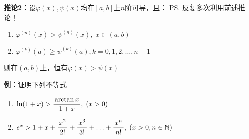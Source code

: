 {\b {\bf 推论2：}设$\varphi(x),\psi(x) $均在$[a,b]$上$n$阶可导，且：
\ps{反复多次利用前述推论！}
\begin{enumerate}[(1)]
  \setlength{\itemindent}{1cm}
  \item $\varphi^{(n)}(x)>\psi^{(n)}(x),\;x\in(a,b)$
  \item $\varphi^{(k)}(a)\geq\psi^{(k)}(a),k=0,1,2,\ldots,n-1$
\end{enumerate}
则在$(a,b)$上，恒有$\varphi(x)>\psi(x)$}

{\bf 例：}证明下列不等式
\begin{enumerate}[(1)]
  \setlength{\itemindent}{1cm}
  \item $\ln(1+x)>\displaystyle\frac{\,{\arctan x}\,}{\,{1+x}\,},\;(x>0)$
  \item $e^x>1+x+\displaystyle\frac{\,{x^2}\,}{\,{2!}\,}+\displaystyle\frac{\,{x^3}\,}{\,{3!}\,}+\ldots+\displaystyle\frac{\,{x^n}\,}{\,{n!}\,},\;(x>0,n\in\mathbb{N})$
\end{enumerate}

\begin{center}
	\quad
\end{center}

